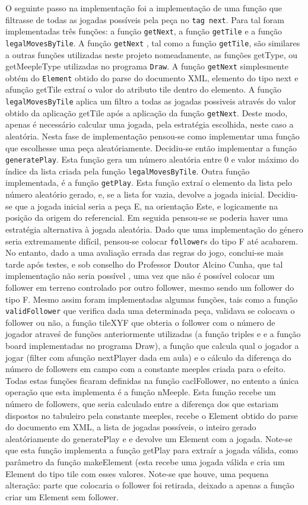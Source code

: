 O seguinte passo na implementação foi a implementação de uma função que filtrasse de todas as jogadas possíveis pela peça no \texttt{tag next}.
Para tal foram implementadas três funções: a função \texttt{getNext}, a função \texttt{getTile} e a função \texttt{legalMovesByTile}. A função \texttt{getNext} , tal como a função \texttt{getTile}, são similares a outras funções utilizadas neste projeto nomeadamente, as funções getType, ou getMeepleType utilizadas no programa \texttt{Draw}. A função \texttt{getNext} simplesmente 
obtém do \texttt{Element} obtido do parse do documento XML, elemento do tipo next e afunção getTile extraí o valor do atributo tile dentro do elemento.
A função \texttt{legalMovesByTile} aplica um filtro a todas as jogadas possiveis através do valor obtido da aplicação getTile após a aplicação da função \texttt{getNext}.
Deste modo, apenas é necessário calcular uma jogada, pela estratégia escolhida, neste caso a aleatória. Nesta fase de implementação pensou-se como implementar uma função que escolhesse uma peça aleatóriamente. Decidiu-se então implementar a função \texttt{generatePlay}. Esta função gera um número aleatória entre 0 e valor máximo do índice da lista criada pela função \texttt{legalMovesByTile}. Outra função implementada, é a função \texttt{getPlay}. Esta função extraí o elemento da lista pelo número aleatório gerado, e, se a lista for vazia, devolve a jogada inicial. Decidiu-se que a jogada inicial seria a peça E, na orientação Este, e logicamente na posição da origem do referencial. Em seguida pensou-se se poderia haver uma estratégia alternativa à jogada aleatória. Dado que uma implementação do género seria extremamente difícil, pensou-se colocar \texttt{follower}s do tipo F até acabarem. No entanto, dado a uma avaliação errada das regras do jogo, conclui-se mais tarde após testes, e sob conselho do Professor Doutor Alcino Cunha, que tal implementação não seria possível , uma vez que não é possível colocar um follower em terreno controlado por outro follower, mesmo sendo um follower do tipo F. Mesmo assim foram implementadas algumas funções, tais como a função \texttt{validFollower} que verifica dada uma determinada peça, validava se colocava o follower ou não, a função tileXYF que obteria o follower com o número de jogador atraveś de funções anteriormente utilizadas (a função triples e e a função board implementadas no programa Draw), a função que calcula qual o jogador a jogar (filter com afunção nextPlayer dada em aula) e o cálculo da diferença do número de followers em campo com a constante meeples criada para o efeito. Todas estas funções ficaram definidas na função caclFollower, no entento a única operação que esta implementa é a função nMeeple. Esta função recebe um número de followers, que seria calculado entre a diferença dos que estariam dispostos no tabuleiro pela constante meeples, recebe o Element obtido do parse do documento em XML, a lista de jogadas possíveis, o inteiro gerado aleatóriamente do generatePlay e e devolve um Element com a jogada. Note-se que esta função implementa a função getPlay para extraír a jogada válida, como parâmetro da função makeElement (esta recebe uma jogada válida e cria um Element do tipo tile com esses valores. Note-se que houve, uma pequena alteração: parte que colocaria o follower foi retirada, deixado a apenas a função criar um Element sem follower.
